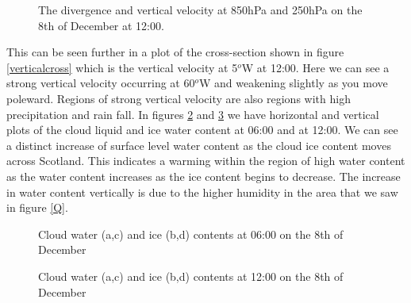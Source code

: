 \documentclass[12pt,a4paper]{article}
\begin{document}
\begin{figure}[H]
    \centering
        \caption{The divergence and vertical velocity at 850hPa and 250hPa on the 8th of December at 12:00.}
        \label{divergence}
\end{figure}
This can be seen further in a plot of the cross-section shown in figure \ref{verticalcross} which is the vertical velocity at 5$^o$W at 12:00. Here we can see a strong vertical velocity occurring at 60$^o$W and weakening slightly as you move poleward. Regions of strong vertical velocity are also regions with high precipitation and rain fall. In figures \ref{cloudcontents600} and \ref{cloudcontents1200} we have horizontal and vertical plots of the cloud liquid and ice water content at 06:00 and at 12:00. We can see a distinct increase of surface level water content as the cloud ice content moves across Scotland. This indicates a warming within the region of high water content as the water content increases as the ice content begins to decrease. The increase in water content vertically is due to the higher humidity in the area that we saw in figure \ref{Q}.
\begin{figure}
\centering
{}
\label{cloudcontents600}
\caption{Cloud water (a,c) and ice (b,d) contents at 06:00 on the 8th of December}
\end{figure}

\begin{figure}
\centering
{}
\caption{Cloud water (a,c) and ice (b,d) contents at 12:00 on the 8th of December}
\label{cloudcontents1200}
\end{figure}
\end{document}
